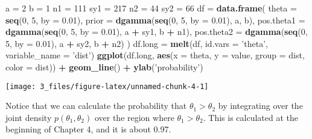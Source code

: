 \documentclass[]{article}
\newenvironment{Shaded}{\begin{snugshade}}{\end{snugshade}}
\newcommand{\DataTypeTok}[1]{\textcolor[rgb]{0.13,0.29,0.53}{#1}}
\newcommand{\DecValTok}[1]{\textcolor[rgb]{0.00,0.00,0.81}{#1}}
\newcommand{\FloatTok}[1]{\textcolor[rgb]{0.00,0.00,0.81}{#1}}
\newcommand{\KeywordTok}[1]{\textcolor[rgb]{0.13,0.29,0.53}{\textbf{#1}}}
\newcommand{\NormalTok}[1]{#1}
\newcommand{\OperatorTok}[1]{\textcolor[rgb]{0.81,0.36,0.00}{\textbf{#1}}}
\newcommand{\StringTok}[1]{\textcolor[rgb]{0.31,0.60,0.02}{#1}}
\begin{document}
\begin{Shaded}
\begin{Highlighting}[]
\NormalTok{a =}\StringTok{ }\DecValTok{2}
\NormalTok{b =}\StringTok{ }\DecValTok{1}
\NormalTok{n1 =}\StringTok{ }\DecValTok{111}
\NormalTok{sy1 =}\StringTok{ }\DecValTok{217}
\NormalTok{n2 =}\StringTok{ }\DecValTok{44}
\NormalTok{sy2 =}\StringTok{ }\DecValTok{66}
\NormalTok{df =}\StringTok{ }\KeywordTok{data.frame}\NormalTok{(}
  \DataTypeTok{theta =} \KeywordTok{seq}\NormalTok{(}\DecValTok{0}\NormalTok{, }\DecValTok{5}\NormalTok{, }\DataTypeTok{by =} \FloatTok{0.01}\NormalTok{),}
  \DataTypeTok{prior =} \KeywordTok{dgamma}\NormalTok{(}\KeywordTok{seq}\NormalTok{(}\DecValTok{0}\NormalTok{, }\DecValTok{5}\NormalTok{, }\DataTypeTok{by =} \FloatTok{0.01}\NormalTok{), a, b),}
  \DataTypeTok{pos.theta1 =} \KeywordTok{dgamma}\NormalTok{(}\KeywordTok{seq}\NormalTok{(}\DecValTok{0}\NormalTok{, }\DecValTok{5}\NormalTok{, }\DataTypeTok{by =} \FloatTok{0.01}\NormalTok{), a }\OperatorTok{+}\StringTok{ }\NormalTok{sy1, b }\OperatorTok{+}\StringTok{ }\NormalTok{n1),}
  \DataTypeTok{pos.theta2 =} \KeywordTok{dgamma}\NormalTok{(}\KeywordTok{seq}\NormalTok{(}\DecValTok{0}\NormalTok{, }\DecValTok{5}\NormalTok{, }\DataTypeTok{by =} \FloatTok{0.01}\NormalTok{), a }\OperatorTok{+}\StringTok{ }\NormalTok{sy2, b }\OperatorTok{+}\StringTok{ }\NormalTok{n2)}
\NormalTok{)}
\NormalTok{df.long =}\StringTok{ }\KeywordTok{melt}\NormalTok{(df, }\DataTypeTok{id.vars =} \StringTok{'theta'}\NormalTok{, }\DataTypeTok{variable_name =} \StringTok{'dist'}\NormalTok{)}
\KeywordTok{ggplot}\NormalTok{(df.long, }\KeywordTok{aes}\NormalTok{(}\DataTypeTok{x =}\NormalTok{ theta, }\DataTypeTok{y =}\NormalTok{ value, }\DataTypeTok{group =}\NormalTok{ dist, }\DataTypeTok{color =}\NormalTok{ dist)) }\OperatorTok{+}
\StringTok{  }\KeywordTok{geom_line}\NormalTok{() }\OperatorTok{+}
\StringTok{  }\KeywordTok{ylab}\NormalTok{(}\StringTok{'probability'}\NormalTok{)}
\end{Highlighting}
\end{Shaded}

\begin{center}\texttt{[image: 3\_files/figure-latex/unnamed-chunk-4-1]} \end{center}

Notice that we can calculate the probability that
\(\theta_1 > \theta_2\) by integrating over the joint density
\(p(\theta_1, \theta_2)\) over the region where \(\theta_1 > \theta_2\).
This is calculated at the beginning of Chapter 4, and it is about 0.97.
\end{document}
